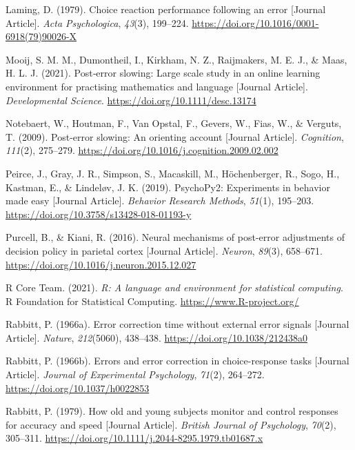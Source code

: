 \documentclass[
  man,floatsintext]{apa7}
\newlength{\cslhangindent}
\newlength{\cslentryspacingunit} %
\newenvironment{CSLReferences}[2] %
 {%
  \setlength{\parindent}{0pt}
  \ifodd #1
  \let\oldpar\par
  \def\par{\hangindent=\cslhangindent\oldpar}
  \fi
  \setlength{\parskip}{#2\cslentryspacingunit}
 }%
 {}
\begin{document}
\begin{CSLReferences}{1}{0}
\leavevmode{}%
Laming, D. (1979). Choice reaction performance following an error {[}Journal Article{]}. \emph{Acta Psychologica}, \emph{43}(3), 199--224. \url{https://doi.org/10.1016/0001-6918(79)90026-X}

\leavevmode{}%
Mooij, S. M. M., Dumontheil, I., Kirkham, N. Z., Raijmakers, M. E. J., \& Maas, H. L. J. (2021). Post‐error slowing: Large scale study in an online learning environment for practising mathematics and language {[}Journal Article{]}. \emph{Developmental Science}. \url{https://doi.org/10.1111/desc.13174}

\leavevmode{}%
Notebaert, W., Houtman, F., Van Opstal, F., Gevers, W., Fias, W., \& Verguts, T. (2009). Post-error slowing: An orienting account {[}Journal Article{]}. \emph{Cognition}, \emph{111}(2), 275--279. \url{https://doi.org/10.1016/j.cognition.2009.02.002}

\leavevmode{}%
Peirce, J., Gray, J. R., Simpson, S., Macaskill, M., Höchenberger, R., Sogo, H., Kastman, E., \& Lindeløv, J. K. (2019). PsychoPy2: Experiments in behavior made easy {[}Journal Article{]}. \emph{Behavior Research Methods}, \emph{51}(1), 195--203. \url{https://doi.org/10.3758/s13428-018-01193-y}

\leavevmode{}%
Purcell, B., \& Kiani, R. (2016). Neural mechanisms of post-error adjustments of decision policy in parietal cortex {[}Journal Article{]}. \emph{Neuron}, \emph{89}(3), 658--671. \url{https://doi.org/10.1016/j.neuron.2015.12.027}

\leavevmode{}%
R Core Team. (2021). \emph{R: A language and environment for statistical computing}. R Foundation for Statistical Computing. \url{https://www.R-project.org/}

\leavevmode{}%
Rabbitt, P. (1966a). Error correction time without external error signals {[}Journal Article{]}. \emph{Nature}, \emph{212}(5060), 438--438. \url{https://doi.org/10.1038/212438a0}

\leavevmode{}%
Rabbitt, P. (1966b). Errors and error correction in choice-response tasks {[}Journal Article{]}. \emph{Journal of Experimental Psychology}, \emph{71}(2), 264--272. \url{https://doi.org/10.1037/h0022853}

\leavevmode{}%
Rabbitt, P. (1979). How old and young subjects monitor and control responses for accuracy and speed {[}Journal Article{]}. \emph{British Journal of Psychology}, \emph{70}(2), 305--311. \url{https://doi.org/10.1111/j.2044-8295.1979.tb01687.x}


\end{CSLReferences}
\end{document}
